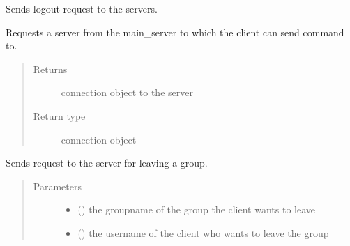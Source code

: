 \documentclass[letterpaper,10pt,english]{sphinxmanual}
\begin{document}

\begin{fulllineitems}
\label{\detokenize{client:client.disconnect}}
Sends logout request to the servers.

\end{fulllineitems}


\begin{fulllineitems}
\label{\detokenize{client:client.getServer}}
Requests a server from the main\_server to which the client can send command to.
\begin{quote}\begin{description}
\item[{Returns}] \leavevmode
connection object to the server

\item[{Return type}] \leavevmode
connection object

\end{description}\end{quote}

\end{fulllineitems}


\begin{fulllineitems}
\label{\detokenize{client:client.leave_group}}
Sends request to the server for leaving a group.
\begin{quote}\begin{description}
\item[{Parameters}] \leavevmode\begin{itemize}
\item {} 
 () \textendash{} the groupname of the group the client wants to leave

\item {} 
 () \textendash{} the username of the client who wants to leave the group

\end{itemize}

\end{description}\end{quote}

\end{fulllineitems}
\end{document}
